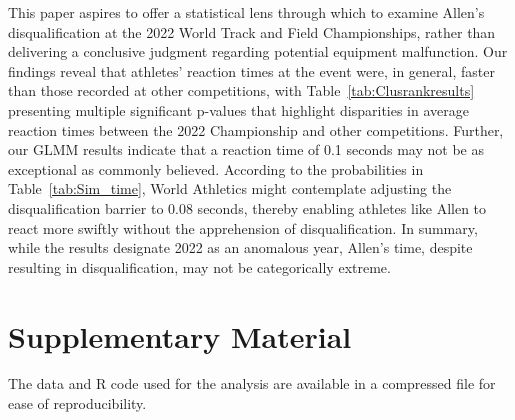 \documentclass[12pt, letterpaper]{article}
\begin{document}
This paper aspires to offer a statistical lens through which to examine Allen's
disqualification at the 2022 World Track and Field Championships, rather than
delivering a conclusive judgment regarding potential equipment malfunction. Our
findings reveal that athletes' reaction times at the event were, in general,
faster than those recorded at other competitions, with
Table~\ref{tab:Clusrankresults} presenting multiple significant p-values that
highlight disparities in average reaction times between the 2022 Championship
and other competitions. Further, our GLMM results indicate that a reaction time
of 0.1 seconds may not be as exceptional as commonly believed. According to the
probabilities in Table~\ref{tab:Sim_time}, World Athletics might contemplate
adjusting the disqualification barrier to 0.08 seconds, thereby enabling athletes
like Allen to react more swiftly without the apprehension of
disqualification. In summary, while the results designate 2022 as an anomalous
year, Allen's time, despite resulting in disqualification, may not be
categorically extreme.


\section*{Supplementary Material}
The data and R code used for the analysis are available in a compressed file for
ease of reproducibility.



\end{document}
